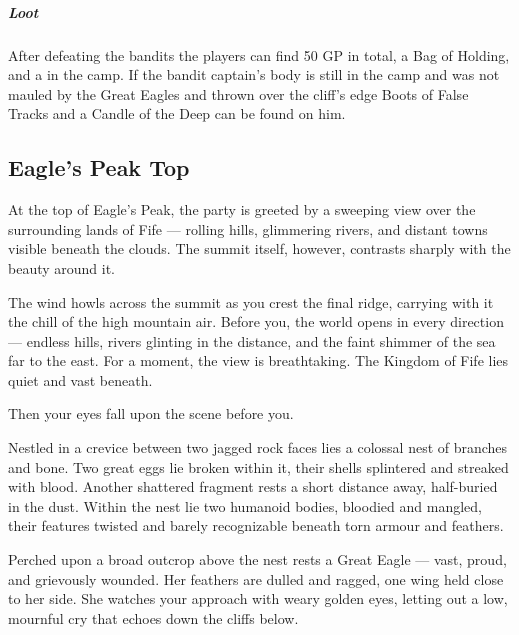 \subparagraph*{Loot}
{\entryfont After defeating the bandits the players can find 50 GP in total, a Bag of Holding, and a \hyperref[resource:TatteredDirective]{} in the camp. If the bandit captain's body is still in the camp and was not mauled by the Great Eagles and thrown over the cliff's edge Boots of False Tracks and a Candle of the Deep can be found on him.}
\vfill\eject
\subsection*{Eagle's Peak Top}
{\entryfont At the top of Eagle's Peak, the party is greeted by a sweeping view over the surrounding lands of Fife — rolling hills, glimmering rivers, and distant towns visible beneath the clouds. The summit itself, however, contrasts sharply with the beauty around it.}

\begin{DndReadAloud}
	The wind howls across the summit as you crest the final ridge, carrying with it the chill of the high mountain air. Before you, the world opens in every direction — endless hills, rivers glinting in the distance, and the faint shimmer of the sea far to the east. For a moment, the view is breathtaking. The Kingdom of Fife lies quiet and vast beneath.

	Then your eyes fall upon the scene before you.

	Nestled in a crevice between two jagged rock faces lies a colossal nest of branches and bone. Two great eggs lie broken within it, their shells splintered and streaked with blood. Another shattered fragment rests a short distance away, half-buried in the dust. Within the nest lie two humanoid bodies, bloodied and mangled, their features twisted and barely recognizable beneath torn armour and feathers.

	Perched upon a broad outcrop above the nest rests a Great Eagle — vast, proud, and grievously wounded. Her feathers are dulled and ragged, one wing held close to her side. She watches your approach with weary golden eyes, letting out a low, mournful cry that echoes down the cliffs below.
\end{DndReadAloud}


